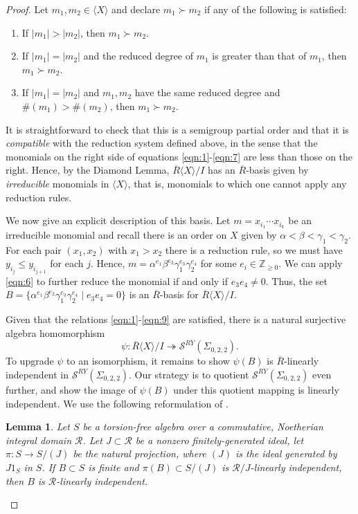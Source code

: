 \documentclass{article}
\newcommand{\Z}{\mathbb{Z}}
\newcommand{\onto}{\twoheadrightarrow}
\renewcommand{\a}{\alpha}
\renewcommand{\b}{\beta}
\newcommand{\g}{\gamma}
\renewcommand{\S}{\mathcal{S}}
\newtheorem{lemma}[theorem]{Lemma}
\theoremstyle{definition}
\renewcommand{\g}{\gamma}
\renewcommand{\a}{\alpha}
\renewcommand{\b}{\beta}
\begin{document}
\begin{proof}
Let $m_1,m_2\in \langle X\rangle$ and declare $m_1\succ m_2$ if any of the following is satisfied:
\begin{enumerate}
        \item If $|m_1|>|m_2|$, then $m_1 \succ m_2$.
        \item If $|m_1|=|m_2|$ and the reduced degree of $m_1$ is greater than that of $m_1$, then $m_1\succ m_2$.
        \item If $|m_1|=|m_2|$ and $m_1,m_2$ have the same reduced degree and $\#(m_1)>\#(m_2)$, then $m_1 \succ m_2$.
\end{enumerate}

It is straightforward to check that this is a semigroup partial order and that it is \textit{compatible} with the reduction system defined above, in the sense that the monomials on the right side of equations \eqref{eqn:1}-\eqref{eqn:7} are less than those on the right.
Hence, by the Diamond Lemma, $\overline{R}\langle X\rangle /I$ has an $\overline{R}$-basis given by \textit{irreducible} monomials in $\langle X\rangle$, that is, monomials to which one cannot apply any reduction rules.

We now give an explicit description of this basis. Let $m=x_{i_1}\cdots x_{i_k}$ be an irreducible monomial and recall there is an order on $X$ given by $\a<\b<\g_1<\g_2$. For each pair $(x_1,x_2)$ with $x_1>x_2$ there is a reduction rule, so we must have $y_{i_j}\leq y_{i_{j+1}}$ for each $j$. Hence, $m=\a^{e_1}\b^{e_2}\g_1^{e_3}\g_2^{e_4}$ for some $e_i\in \Z_{\geq0}$. We can apply \eqref{eqn:6} to further reduce the monomial if and only if $e_3e_4\neq 0$. Thus, the set $B=\{\a^{e_1}\b^{e_2}\g_1^{e_3}\g_2^{e_4}\mid e_3e_4=0\}$ is an $\overline{R}$-basis for $\overline{R}\langle X\rangle /I$.

Given that the relations \eqref{eqn:1}-\eqref{eqn:9} are satisfied, there is a natural surjective algebra homomorphism 
\[
\psi:\overline{R}\langle X\rangle /I\onto \S^{RY}(\Sigma_{0,2,2}).
\]
To upgrade $\psi$ to an isomorphism, it remains to show $\psi(B)$ is $\overline{R}$-linearly independent in $\S^{RY}(\Sigma_{0,2,2})$. Our strategy is to quotient $\S^{RY}(\Sigma_{0,2,2})$ even further, and show the image of $\psi(B)$ under this quotient mapping is linearly independent. We use the following reformulation of \cite[Lemma~1.2]{BullockPrz}.


 \begin{lemma}\label{lem:lin-ind-ring}
    Let $S$ be a torsion-free algebra over a commutative, Noetherian integral domain $\mathcal{R}$. Let $J \subset \mathcal{R}$ be a nonzero finitely-generated ideal, let $\pi:S\to S/(J)$ be the natural projection, where $(J)$ is the ideal generated by $J1_S$ in $S$. If $B\subset S$ is finite and $\pi(B)\subset S/(J)$ is $\mathcal{R}/J$-linearly independent, then $B$ is $\mathcal{R}$-linearly independent.
\end{lemma}


\end{proof}
\end{document}
